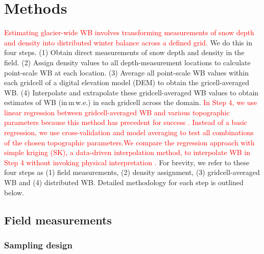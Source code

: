 \documentclass[review,oneside, letterpaper]{igs}
\begin{document}


\section{Methods}

\textcolor{red}{Estimating glacier-wide WB involves transforming measurements of snow depth and density into distributed winter balance across a defined grid.} We do this in four steps. (1) Obtain direct measurements of snow depth and density in the field. (2) Assign density values to all depth-measurement locations to calculate point-scale WB at each location. (3) Average all point-scale WB values within each gridcell of a digital elevation model (DEM) to obtain the gricell-averaged WB. (4) Interpolate and extrapolate these gridcell-averaged WB values to obtain estimates of WB (in\,m\,w.e.) in each gridcell across the domain. \textcolor{red}{In Step 4, we use linear regression between gridcell-averaged WB and various topographic parameters because this method has precedent for success \citep[e.g.][]{McGrath2015}. Instead of a basic regression, we use cross-validation and model averaging to test all combinations of the chosen topographic parameters.We compare the regression approach with simple kriging (SK), a data-driven interpolation method, to interpolate WB in Step 4 without invoking physical interpretation \citep[e.g.][]{Hock1999}.} For brevity, we refer to these four steps as (1) field measurements, (2) density assignment, (3) gridcell-averaged WB and (4) distributed WB. Detailed methodology for each step is outlined below.

\subsection{Field measurements}

\subsubsection{Sampling design}
\end{document}
